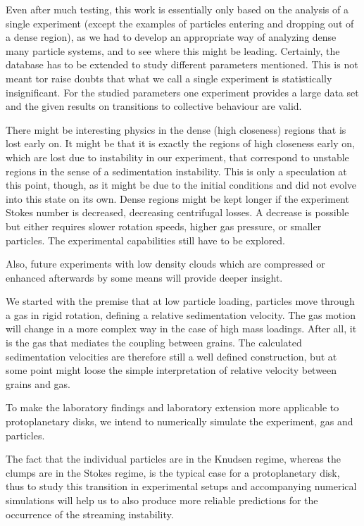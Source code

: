 Even after much testing, this work is essentially only based on the analysis of a single experiment (except the examples of particles entering and dropping out of a dense region), as we had to develop an appropriate way of analyzing dense many particle systems, and to see where this might be leading. {Certainly, the database has to be extended to study different parameters mentioned. This is not meant tor raise doubts that what we call a single experiment is statistically insignificant. For the studied parameters one experiment provides a large data set and the given results on transitions to collective behaviour are valid.}

There might be interesting physics in the dense (high closeness) regions that 
is lost early on. It might be that it is exactly the regions of high closeness early on, which are lost due to instability in our experiment, that correspond to unstable regions in the sense of a sedimentation instability. This is only a speculation at this point, though, as it might be due to the initial conditions and did not evolve into this state on its own. Dense regions might be kept longer if the experiment Stokes number is decreased, decreasing centrifugal losses. 
A decrease is possible but either requires slower rotation speeds, higher gas pressure, or smaller particles.
The experimental capabilities still have to be explored. 

Also, future experiments with low density clouds which are compressed or enhanced afterwards by some means will provide deeper insight.

We started with the premise that at low particle loading, particles move 
through a gas in rigid rotation, defining a relative sedimentation velocity. The gas motion will change in a more complex way in the case of high mass loadings. After all, it is the gas that mediates the coupling between grains. The calculated sedimentation velocities are therefore still a well defined construction, but at some point might loose the simple interpretation of relative velocity between grains and gas. 

To make the laboratory findings and laboratory extension more applicable to protoplanetary disks, we intend to numerically simulate the experiment, gas and particles.

{The fact that the individual particles are in the Knudsen regime, whereas the clumps are in the Stokes regime, is the typical case for a protoplanetary disk, thus to study this transition in experimental setups and accompanying numerical simulations will help us to also produce more reliable predictions for the occurrence of the streaming instability.}

